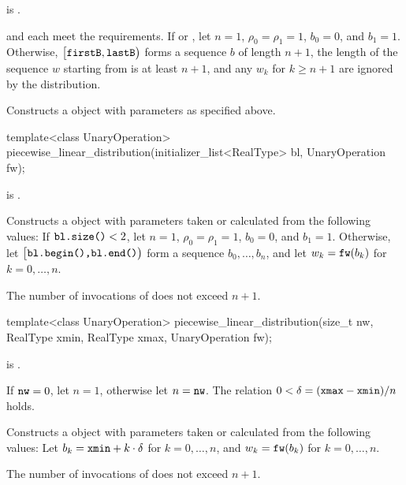 \begin{itemdescr}
\pnum
\mandates
{} is .

\pnum
\expects
   and 
   each meet the
   requirements.
 If 
 or ,
 let $n = 1$,
     $\rho_0 = \rho_1 = 1$,
     $b_0 = 0$,
 and $b_1 = 1$.
 Otherwise,
 $\bigl[\texttt{firstB}, \texttt{lastB}\bigr)$
 forms a sequence $b$ of length $n+1$,
 the length of the sequence $w$ starting from 
 is at least $n+1$,
 and any $w_k$ for $k \geq n + 1$ are ignored by the distribution.

\pnum
\effects
Constructs a  object
 with parameters as specified above.
\end{itemdescr}


%
\begin{itemdecl}
template<class UnaryOperation>
 piecewise_linear_distribution(initializer_list<RealType> bl, UnaryOperation fw);
\end{itemdecl}

\begin{itemdescr}
\pnum
\mandates
{} is .

\pnum
\effects
Constructs a  object
 with parameters taken or calculated
 from the following values:
 If $\texttt{bl.size()} < 2$,
 let $n = 1$,
     $\rho_0 = \rho_1 = 1$,
     $b_0 = 0$,
 and $b_1 = 1$.
 Otherwise,
 let $\bigl[\texttt{bl.begin(),} \texttt{bl.end()}\bigr)$
 form a sequence $b_0, \dotsc, b_n$,
 and
 let $w_k = \texttt{fw}(b_k)$
 for $k = 0, \dotsc, n$.

\pnum
\complexity
The number of invocations of  does not exceed $n+1$.
\end{itemdescr}


%
\begin{itemdecl}
template<class UnaryOperation>
 piecewise_linear_distribution(size_t nw, RealType xmin, RealType xmax, UnaryOperation fw);
\end{itemdecl}

\begin{itemdescr}
\pnum
\mandates
{} is .

\pnum
\expects
 If $\texttt{nw} = 0$, let $n = 1$, otherwise let $n = \texttt{nw}$.
 The relation $0 < \delta = (\texttt{xmax} - \texttt{xmin}) / n$
 holds.

\pnum
\effects
Constructs a  object
 with parameters taken or calculated
 from the following values:
 Let $b_k = \texttt{xmin} + k \cdot \delta$ for $k = 0, \dotsc, n$,
 and $w_k = \texttt{fw}(b_k)$ for $k = 0, \dotsc, n$.

\pnum
\complexity
The number of invocations of  does not exceed $n+1$.
\end{itemdescr}

